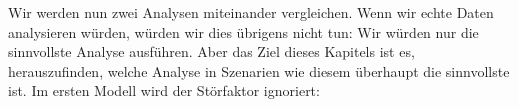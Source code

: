 Wir werden nun zwei Analysen miteinander vergleichen. Wenn wir
echte Daten analysieren würden, würden wir dies übrigens nicht tun: Wir
würden nur die sinnvollste Analyse ausführen. Aber das Ziel dieses
Kapitels ist es, herauszufinden, welche Analyse in Szenarien
wie diesem überhaupt die sinnvollste ist. Im ersten Modell
wird der Störfaktor ignoriert:
\begin{knitrout}
\color{fgcolor}\begin{kframe}
\begin{alltt}
 \hlkwb{<-}  \hlopt{~}   
\end{alltt}


{\ttfamily\noindent\bfseries\color{errorcolor}{\#\# Error in is.data.frame(data): object 'd' not found}}\begin{alltt}
\hlopt{$}
\end{alltt}


{\ttfamily\noindent\bfseries\color{errorcolor}{\#\# Error in summary(dag1.lm1): object 'dag1.lm1' not found}}\end{kframe}
\end{knitrout}
% 
